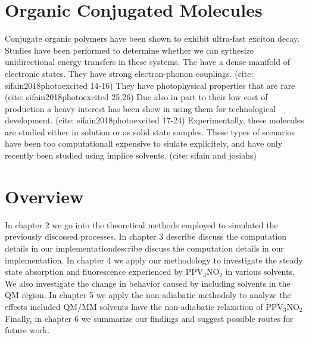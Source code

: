 \section{Organic Conjugated Molecules}
Conjugate organic polymers have been shown to exhibit ultra-fast exciton decay.\cite{nelson2018coherent,Fernandez-Alberti2009}
Studies have been performed to determine whether we can sythesize unidirectional energy transfers in these systems.\cite{soler2012analysis,soler2014signature,Galindo2015,FernandezAlberti2010,FernandezAlberti2012}
The have a dense manifold of electronic states.
They have strong electron-phonon couplings. (cite: sifain2018photoexcited 14-16)
They have photophysical properties that are rare (cite: sifain2018photoexcited 25,26)
Due also in part to their low cost of production a heavy interest has been show in using them for technological development. (cite: sifain2018photoexcited 17-24)
Experimentally, these molecules are studied either in solution or as solid state samples.
These types of scenarios have been too computationall expensive to siulate explicitely, and have only recently been studied using implice solvents. (cite: sifain and josiahs)

\section{Overview}
In chapter 2 we go into the theoretical methods employed to simulated the previously discossed processes.
In chapter 3 describe discuss the computation details in our implementationdescribe discuss the computation details in our implementation.
In chapter 4 we apply our methodology to investigate the steady state absorption and fluorescence experienced by PPV\(_3\)NO\(_2\) in various solvents.
We also investigate the change in behavior caused by including solvents in the QM region.
In chapter 5 we apply the non-adiabatic methodoly to analyze the effects included QM/MM solvents have the non-adiabatic relaxation of PPV\(_3\)NO\(_2\) 
Finally, in chapter 6 we summarize our findings and suggest possible routes for future work.
